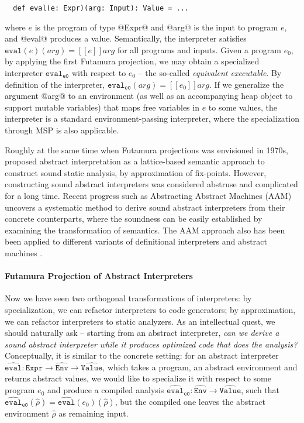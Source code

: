 \begin{lstlisting}
  def eval(e: Expr)(arg: Input): Value = ...
\end{lstlisting}

where $e$ is the program of type @Expr@ and @arg@ is the input to program $e$,
and @eval@ produces a value.
Semantically, the interpreter satisfies $ \texttt{eval}(e)(arg) = [\![ e ]\!] arg$ for all
programs and inputs. Given a program $e_0$, by applying the first Futamura
projection, we may obtain a specialized interpreter
$\texttt{eval}_{\texttt{e0}}$ with respect to $e_0$ -- the so-called \textit{equivalent executable}. 
By definition of the interpreter, 
$\texttt{eval}_{\texttt{e0}}(arg) = [\![ e_0 ]\!] arg $. If we generalize the
argument @arg@ to an environment (as well as an accompanying heap object to
support mutable variables) that maps free variables in $e$ to some
values, the interpreter is a standard environment-passing interpreter,
where the specialization through MSP is also applicable.

Roughly at the same time when Futamura projections was envisioned in 1970s,
\citet{DBLP:conf/popl/CousotC77} proposed abstract interpretation as a
lattice-based semantic approach to construct sound static analysis, by
approximation of fix-points. However, constructing sound abstract interpreters
was considered abstruse and complicated for a long time.
Recent progress such as Abstracting Abstract Machines (AAM)
\cite{DBLP:conf/icfp/HornM10} uncovers a systematic method to derive sound
abstract interpreters from their concrete counterparts, where the soundness can
be easily established by examining the transformation of semantics. The AAM
approach also has been been applied to different variants of definitional
interpreters and abstract machines \cite{DBLP:journals/jfp/HornM12,
DBLP:conf/icfp/HornM10, DBLP:journals/pacmpl/DaraisLNH17}.

\paragraph{Futamura Projection of Abstract Interpreters}

Now we have seen two orthogonal transformations of interpreters: by
specialization, we can refactor interpreters to code generators; by
approximation, we can refactor interpreters to static analyzers. As an
intellectual quest, we should naturally ask -- starting from an abstract
interpreter, \textit{can we derive a sound abstract interpreter while it
produces optimized code that does the analysis?}
Conceptually, it is similar to the concrete setting: for an
abstract interpreter $\widehat{\texttt{eval}}: \texttt{Expr} \to
\widehat{\texttt{Env}} \to \widehat{\texttt{Value}}$, which takes a program, an abstract
environment and returns abstract values, we would like to specialize it with
respect to some program $e_0$ and produce a compiled analysis
$\widehat{\texttt{eval}}_{\texttt{e0}} : \widehat{\texttt{Env}} \to
\widehat{\texttt{Value}}$, such that $
\widehat{\texttt{eval}}_{\texttt{e0}}(\widehat{\rho}) =
\widehat{\texttt{eval}}(e_0)(\widehat{\rho})$, but the compiled one leaves the
abstract environment $\widehat{\rho}$ as remaining input.

